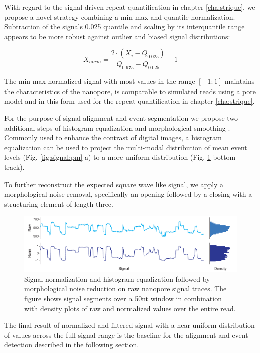 With regard to the signal driven repeat quantification in chapter \ref{cha:strique}, we propose a novel strategy combining a min-max and quantile normalization. Subtraction of the signals 0.025 quantile and scaling by its interquantile range appears to be more robust against outlier and biased signal distributions:

\begin{equation}
	X_{norm} = \frac{2 \cdot (X_{i} - Q_{0.025})}{Q_{0.975} - Q_{0.025}} - 1
\end{equation}

The min-max normalized signal with most values in the range $ [-1:1] $ maintains the characteristics of the nanopore, is comparable to simulated reads using a pore model and in this form used for the repeat quantification in chapter \ref{cha:strique}.

For the purpose of signal alignment and event segmentation we propose two additional steps of  histogram equalization and morphological smoothing \cite{Gonzalez2006}. Commonly used to enhance the contrast of digital images, a histogram equalization can be used to project the multi-modal distribution of mean event levels (Fig. \ref{fig:signal:pm} a) to a more uniform distribution (Fig. \ref{fig:signal:normalization} bottom track). 

To further reconstruct the expected square wave like signal, we apply a morphological noise removal, specifically an opening followed by a closing with a structuring element of length three.

\begin{figure}[h]
	\centering
	\includegraphics[width=1.0\textwidth]{figures/signal/normalization.pdf}
	\captionsetup{format=plain}
	\caption[Signal normalization and histogram equalization]{Signal normalization and histogram equalization followed by morphological noise reduction on raw nanopore signal traces. The figure shows signal segments over a 50nt window in combination with density plots of raw and normalized values over the entire read.}
	\label{fig:signal:normalization}
\end{figure}

The final result of normalized and filtered signal with a near uniform distribution of values across the full signal range is the baseline for the alignment and event detection described in the following section.




